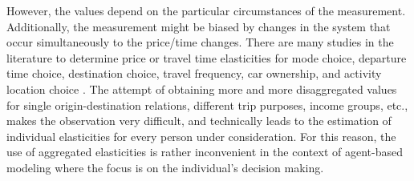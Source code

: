 \begin{oframed}
However, the values depend on the particular circumstances of the measurement. Additionally, the measurement might be biased by changes in the system that occur simultaneously to the price/time changes.
%
There are many studies in the literature to determine price or travel time elasticities for mode choice, departure time choice, destination choice, travel frequency, car ownership, and activity location choice \citep[for an extensive literature review see, 
e.g.,][]{deJong2001Elasticities}. The attempt of obtaining more and more disaggregated values for single origin-destination relations, different trip purposes, income groups, etc., makes the observation very difficult, and technically leads to the estimation of individual elasticities for every person under consideration.
%
For this reason, the use of aggregated elasticities is rather inconvenient in the context of agent-based modeling where the focus is on the individual's decision making. 
%
%
%
\end{oframed}


